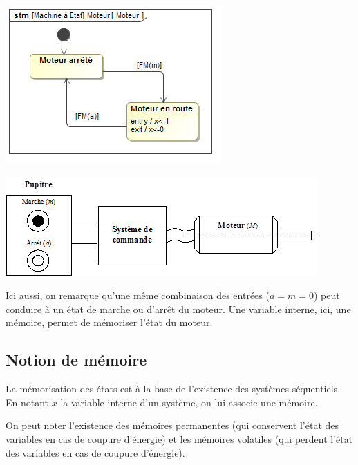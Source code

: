 \documentclass[10pt,fleqn]{article} %
\begin{document}
\begin{minipage}[c]{.47\linewidth}
\begin{center}
\includegraphics[width=.95\textwidth]{images/Moteur}

\includegraphics[width=.95\textwidth]{images/Moteur_im}
\end{center}
\end{minipage}

Ici aussi, on remarque qu'une même combinaison des entrées ($a=m=0$) peut conduire à un état de marche ou d'arrêt du moteur. Une variable interne, ici, une mémoire, permet de mémoriser l'état du moteur. 

\subsection{Notion de mémoire}

La mémorisation des états est à la base de l'existence des systèmes séquentiels. En notant $x$ la variable interne d'un système, on lui associe une mémoire.

 On peut noter l'existence des mémoires permanentes (qui conservent l'état des variables en cas de coupure d'énergie) et les mémoires volatiles (qui perdent l'état des variables en cas de coupure d'énergie).  
 
\end{document}
